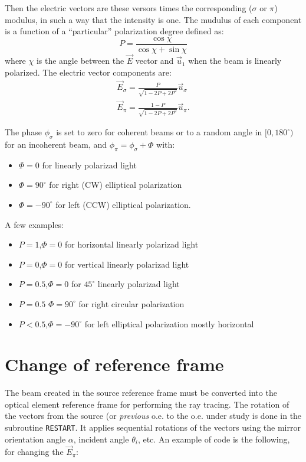 \documentclass[a4paper,10pt]{article}
\begin{document}
Then the electric vectors are these versors times the corresponding ($\sigma$ or $\pi$) modulus, in such a way that 
the intensity is one. The mudulus of each component is a function of a ``particular'' polarization degree defined as:
\begin{equation}
   P = \frac{\cos \chi}{\cos \chi + \sin \chi}
\end{equation}
where $\chi$ is the angle between the $\vec{E}$ vector and $\vec{u}_1$ when the beam is linearly polarized. 
The electric vector components are: 
\begin{eqnarray}
   \vec{E}_\sigma = \frac{P}{\sqrt{1-2 P+ 2 P^2}} \vec{u}_\sigma \nonumber \\
   \vec{E}_\pi    = \frac{1-P}{\sqrt{1-2 P+ 2 P^2}} \vec{u}_\pi.
\end{eqnarray}


The phase $\phi_\sigma$ is set to zero for coherent beams or to a random angle in $[0,180^{\circ})$ for an incoherent beam, and
$\phi_\pi=\phi_\sigma+\Phi$ with: 
\begin{itemize}
 \item $\Phi=0$ for linearly polarizad light 
 \item $\Phi=90^{\circ}$ for right (CW) elliptical polarization
 \item $\Phi=-90^{\circ}$ for left (CCW) elliptical polarization.
\end{itemize}
A few examples: 
\begin{itemize}
 \item $P=1$,$\Phi=0$ for horizontal linearly polarizad light 
 \item $P=0$,$\Phi=0$ for vertical linearly polarizad light
 \item $P=0.5$,$\Phi=0$ for $45^\circ$ linearly polarizad light
 \item $P=0.5$ $\Phi=90^{\circ}$ for right circular polarization
 \item $P<0.5$,$\Phi=-90^{\circ}$ for left elliptical polarization mostly horizontal
\end{itemize}


\section{Change of reference frame}

The beam created in the source reference frame must be converted into the optical element reference frame for performing the
ray tracing. The rotation of the vectors from the source (or {\it previous} o.e. to the o.e. under study is done 
in the subroutine {\tt RESTART}. It applies sequential rotations of the vectors using the mirror orientation angle $\alpha$,
incident angle $\theta_i$, etc. An example of code is the following, for changing the $\vec{E}_\pi$:
\end{document}
